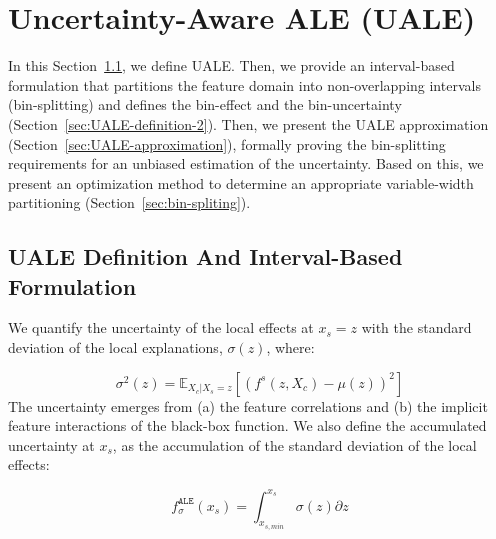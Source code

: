\documentclass[twoside]{article}
\newcommand{\dfdx}{f^s}
\begin{document}

\section{Uncertainty-Aware ALE (UALE)}
\label{sec:UALE}

In this Section~\ref{sec:UALE-definition-1}, we define UALE. Then, we
provide an interval-based formulation that partitions the feature
domain into non-overlapping intervals (bin-splitting) and defines the
bin-effect and the bin-uncertainty
(Section~\ref{sec:UALE-definition-2}). Then, we present the UALE
approximation (Section~\ref{sec:UALE-approximation}), formally proving
the bin-splitting requirements for an unbiased estimation of the
uncertainty. Based on this, we present an optimization method to
determine an appropriate variable-width partitioning
(Section~\ref{sec:bin-spliting}).

\subsection{UALE Definition And Interval-Based Formulation}
\label{sec:UALE-definition-1}

We quantify the uncertainty of the local effects at \(x_s=z\) with the
standard deviation of the local explanations, \(\sigma(z)\), where:

\begin{equation}
  \label{eq:ALE_var}
  \sigma^2(z) = \mathbb{E}_{X_c|X_s=z}\left [ \left (\dfdx (z, X_c) - \mu(z) \right )^2 \right ] 
\end{equation}
\noindent
The uncertainty emerges from (a) the feature correlations and (b) the
implicit feature interactions of the black-box function. We also
define the accumulated uncertainty at \(x_s\), as the accumulation of
the standard deviation of the local effects:

\begin{equation}
  \label{eq:ALE_acc_unc}
  f^{\mathtt{ALE}}_{\sigma}(x_s) = \int_{x_{s, min}}^{x_s} \sigma(z) \partial z
\end{equation}
\noindent
\end{document}
